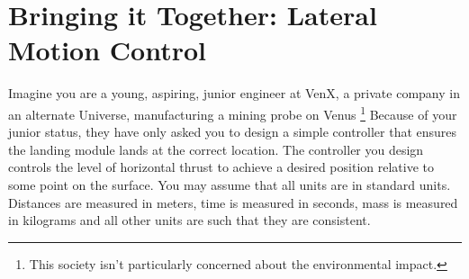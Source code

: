 \chapter{Bringing it Together: Lateral Motion Control}\label{Lab:3}
Imagine you are a young, aspiring, junior engineer at VenX, a private company in an alternate Universe, manufacturing a mining probe on Venus%
\footnote{This society isn't particularly concerned about the environmental impact.}
Because of your junior status, they have only asked you to design a simple controller that ensures the landing module lands at the correct location.
The controller you design controls the level of horizontal thrust to achieve a desired position relative to some point on the surface.
You may assume that all units are in standard units.
Distances are measured in meters, time is measured in seconds, mass is measured in kilograms and all other units are such that they are consistent.

